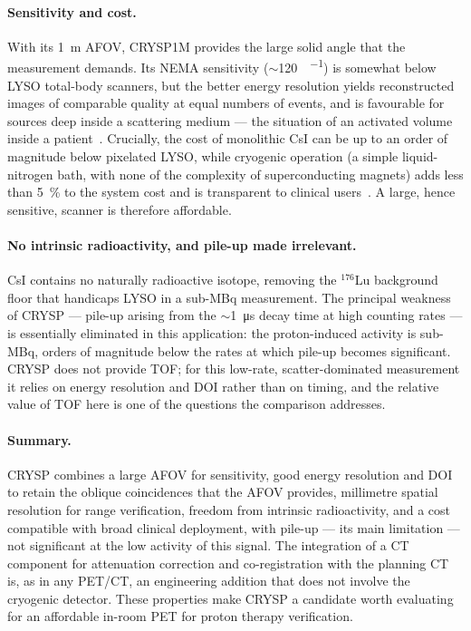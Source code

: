 \documentclass{iopjournal}
\begin{document}
\paragraph{Sensitivity and cost.}
With its \SI{1}{\metre} AFOV, CRYSP1M provides the large solid angle that the
measurement demands. Its NEMA sensitivity ($\sim$\SI{120}{\kcps\per\MBq}) is somewhat
below LYSO total-body scanners, but the better energy resolution yields
reconstructed images of comparable quality at equal numbers of events, and is
favourable for sources deep inside a scattering medium ---
the situation of an activated volume inside a patient~\cite{Soleti:2024flw}.
Crucially, the cost of monolithic CsI can be up to an order of magnitude below
pixelated LYSO, while cryogenic operation (a simple liquid-nitrogen bath, with
none of the complexity of superconducting magnets) adds less than
\SI{5}{\percent} to the system cost and is transparent to clinical
users~\cite{Soleti:2024flw}. A large, hence sensitive, scanner is therefore
affordable.

\paragraph{No intrinsic radioactivity, and pile-up made irrelevant.}
CsI contains no naturally radioactive isotope, removing the $^{176}$Lu
background floor that handicaps LYSO in a sub-MBq measurement. The principal
weakness of CRYSP --- pile-up arising from the $\sim$\SI{1}{\micro\second} decay
time at high counting rates --- is essentially eliminated in this application:
the proton-induced activity is sub-MBq, orders of magnitude below the rates
at which pile-up becomes significant. CRYSP does not provide TOF; for this
low-rate, scatter-dominated measurement it relies on energy resolution and DOI
rather than on timing, and the relative value of TOF here is one of the questions
the comparison addresses.

\paragraph{Summary.}
CRYSP combines a large AFOV for sensitivity, good energy resolution and DOI to
retain the oblique coincidences that the AFOV provides, millimetre spatial
resolution for range verification, freedom from intrinsic radioactivity, and a
cost compatible with broad clinical deployment, with pile-up --- its main
limitation --- not significant at the low activity of this signal. The
integration of a CT component for attenuation correction and co-registration with
the planning CT is, as in any PET/CT, an engineering addition that does not
involve the cryogenic detector. These properties make CRYSP a candidate worth
evaluating for an affordable in-room PET for proton therapy verification.
\end{document}
